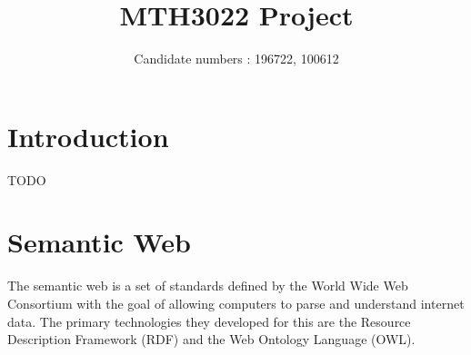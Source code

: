 \documentclass[english, 12pt]{article}
\title{MTH3022 Project} %
\author{Candidate numbers : 196722, 100612}
\date{}
\begin{document}
\maketitle
\section{Introduction}
TODO
\section{Semantic Web}
The semantic web is a set of standards defined by the World Wide Web Consortium\cite{w3c_website} with the goal of allowing computers to parse and understand internet data. The primary technologies they developed for this are the Resource Description Framework\cite{w3c_rdf} (RDF) and the Web Ontology Language\cite{w3c_owl} (OWL).
\end{document}
